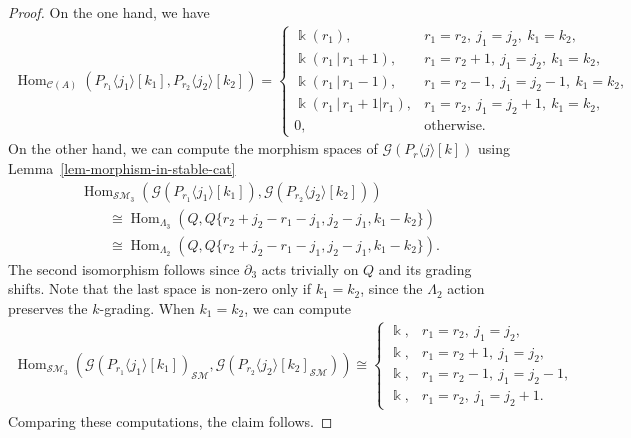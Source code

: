\documentclass[10pt,a4paper]{amsart}
\theoremstyle{definition}
\numberwithin{equation}{section}
\newcommand{\Hom}{\operatorname{Hom}}
\def\dif{\partial}
\def\mc{\mathcal}
\begin{document}
\begin{proof}
On the one hand, we have
\begin{gather*}
 \Hom_{\mc{C}(A)} (P_{r_1}\langle j_1 \rangle[k_1], P_{r_2}\langle j_2 \rangle[k_2] )=
 \begin{cases}
 \Bbbk (r_1), & r_1=r_2,~j_1=j_2,~k_1=k_2,\\
 \Bbbk (r_1\,|\,r_1+1), & r_1=r_2+1,~j_1=j_2,~ k_1=k_2,\\
 \Bbbk (r_1\,|\,r_1-1), & r_1=r_2-1,~j_1=j_2-1,~k_1=k_2,\\
 \Bbbk (r_1\,|\,r_1+1|r_1), & r_1=r_2,~j_1=j_2+1,~ k_1=k_2,\\
 0, & \textrm{otherwise}.
 \end{cases}
\end{gather*}
On the other hand, we can compute the morphism spaces of $\mc{G}(P_r\langle j \rangle [k])$ using Lemma~\ref{lem-morphism-in-stable-cat}
\begin{gather*}
 \Hom_{\mc{SM}_3}\left(\mc{G}(P_{r_1}\langle j_1 \rangle[k_1]),\mc{G}( P_{r_2}\langle j_2 \rangle[k_2])\right) \\
 \qquad{} \cong \Hom_{\Lambda_3}(Q,Q\{r_2+j_2-r_1-j_1, j_2-j_1,k_1-k_2\}) \\
 \qquad{} \cong \Hom_{\Lambda_2}(Q,Q\{r_2+j_2-r_1-j_1, j_2-j_1,k_1-k_2\}).
\end{gather*}
The second isomorphism follows since $\dif_3$ acts trivially on $Q$ and its grading shifts. Note that the last space is non-zero only if $k_1=k_2$, since the $\Lambda_2$ action preserves the $k$-grading. When $k_1=k_2$, we can compute
\begin{gather*}
 \Hom_{\mc{SM}_3} (\mc{G}(P_{r_1}\langle j_1 \rangle[k_1])_{\mc{SM}},\mc{G}( P_{r_2}\langle j_2 \rangle[k_2]_{\mc{SM}}) ) \cong
 \begin{cases}
 \Bbbk, & r_1=r_2,~j_1=j_2,\\
 \Bbbk, & r_1=r_2+1,~j_1=j_2,\\
 \Bbbk, & r_1=r_2-1,~j_1=j_2-1,\\
 \Bbbk, & r_1=r_2,~j_1=j_2+1.
 \end{cases}
\end{gather*}
Comparing these computations, the claim follows.


\end{proof}
\end{document}
